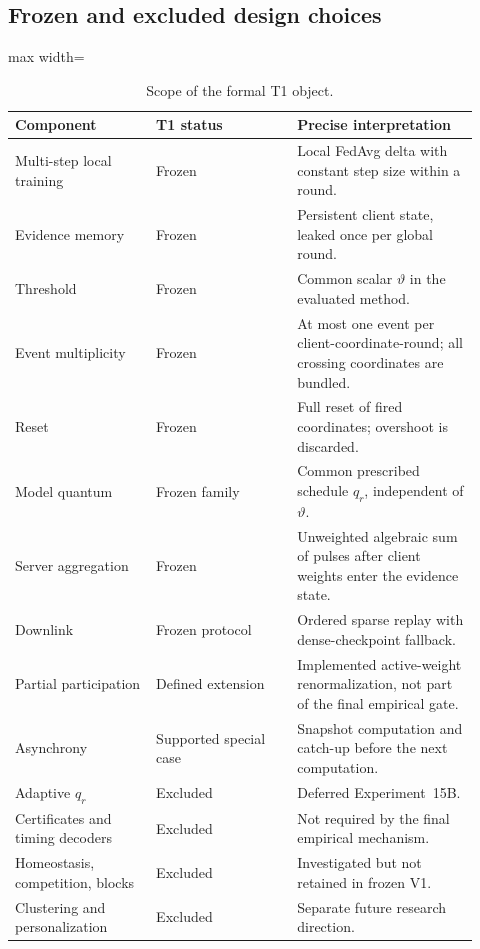 \subsection{Frozen and excluded design choices}

\begin{table}[ht]
\centering
\small
\caption{Scope of the formal T1 object.}
\label{tab:t1-scope}
\begin{adjustbox}{max width=\textwidth}
\begin{tabular}{p{0.28\linewidth}p{0.28\linewidth}p{0.36\linewidth}}
\toprule
Component & T1 status & Precise interpretation\\
\midrule
Multi-step local training & Frozen & Local FedAvg delta with constant step size within a round.\\
Evidence memory & Frozen & Persistent client state, leaked once per global round.\\
Threshold & Frozen & Common scalar $\vartheta$ in the evaluated method.\\
Event multiplicity & Frozen & At most one event per client-coordinate-round; all crossing coordinates are bundled.\\
Reset & Frozen & Full reset of fired coordinates; overshoot is discarded.\\
Model quantum & Frozen family & Common prescribed schedule $q_r$, independent of $\vartheta$.\\
Server aggregation & Frozen & Unweighted algebraic sum of pulses after client weights enter the evidence state.\\
Downlink & Frozen protocol & Ordered sparse replay with dense-checkpoint fallback.\\
Partial participation & Defined extension & Implemented active-weight renormalization, not part of the final empirical gate.\\
Asynchrony & Supported special case & Snapshot computation and catch-up before the next computation.\\
Adaptive $q_r$ & Excluded & Deferred Experiment~15B.\\
Certificates and timing decoders & Excluded & Not required by the final empirical mechanism.\\
Homeostasis, competition, blocks & Excluded & Investigated but not retained in frozen V1.\\
Clustering and personalization & Excluded & Separate future research direction.\\
\bottomrule
\end{tabular}
\end{adjustbox}
\end{table}


